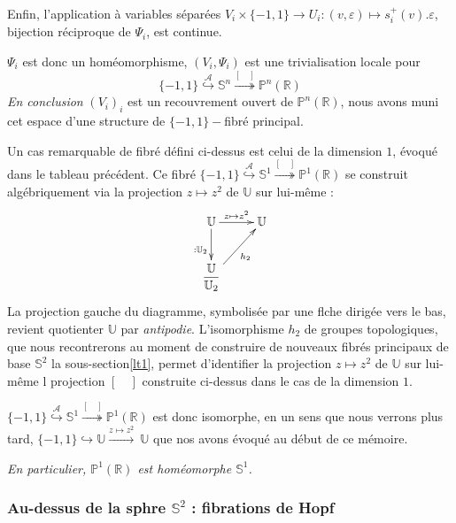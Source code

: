 \begin{exem}
\par
Enfin, l'application à variables s\'epar\'ees $V_i \times \{-1 , 1\} \rightarrow U_i : (v,\varepsilon) \mapsto s_i^+(v).\varepsilon$, %
bijection réciproque de $\Psi_i$, est continue.
\par
$\Psi_i$ est donc un hom\'eomorphisme, $(V_i,\Psi_i)$ est une trivialisation locale pour
\[\{-1,1\} \overset{\mathcal{A}}{\hookrightarrow} \mathbb{S}^n \overset{[\quad]}{\twoheadrightarrow} \mathbb{P}^n(\mathbb{R})\]
%
\emph{En conclusion} $(V_i)_i$ est un recouvrement ouvert de $\mathbb{P}^n(\mathbb{R})$, nous avons muni cet espace d'une structure de $\{-1,1\}-$fibr\'e principal.
\end{exem}

Un cas remarquable de fibr\'e d\'efini ci-dessus est celui de la dimension $1$, \'evoqu\'e dans le tableau pr\'ec\'edent. %
Ce fibr\'e $\{-1,1\} \overset{\mathcal{A}}{\hookrightarrow} \mathbb{S}^1 \overset{[\quad]}{\twoheadrightarrow} \mathbb{P}^1(\mathbb{R})$ %
se construit alg\'ebriquement via la projection $z\mapsto z^2$ de $\mathbb{U}$ sur lui-m\^eme :
\[\xymatrix{%
\mathbb{U} \ar[r]^{z\mapsto z^2} \ar[d]_{:\mathbb{U}_2}&\mathbb{U}\\%
\dfrac{\mathbb{U}}{\mathbb{U}_2} \ar[ru]_{h_2}&%
}\]
La projection  gauche du diagramme, symbolis\'ee par une flche dirig\'ee vers le bas, revient  quotienter $\mathbb{U}$ par \emph{antipodie}. %
L'isomorphisme $h_2$ de groupes topologiques, que nous recontrerons au moment de construire de nouveaux fibr\'es principaux de base $\mathbb{S}^2$  la sous-section\ref{lt1}, %
permet d'identifier la projection $z\mapsto z^2$ de $\mathbb{U}$ sur lui-m\^eme  l projection $[\quad ]$ construite ci-dessus dans le cas de la dimension $1$.
\par
$\{-1,1\} \overset{\mathcal{A}}{\hookrightarrow} \mathbb{S}^1 \overset{[\quad]}{\twoheadrightarrow} \mathbb{P}^1(\mathbb{R})$ est donc isomorphe, %
en un sens que nous verrons plus tard,  $\{-1,1\}\hookrightarrow\mathbb{U}\xrightarrow{z\mapsto z^2}~\mathbb{U}$ que nos avons \'evoqu\'e au d\'ebut de ce m\'emoire.
\par
\emph{En particulier, $\mathbb{P}^1(\mathbb{R})$ est hom\'eomorphe  $\mathbb{S}^1$.}

\subsubsection{Au-dessus de la sphre $\mathbb{S}^2$ : fibrations de Hopf}

